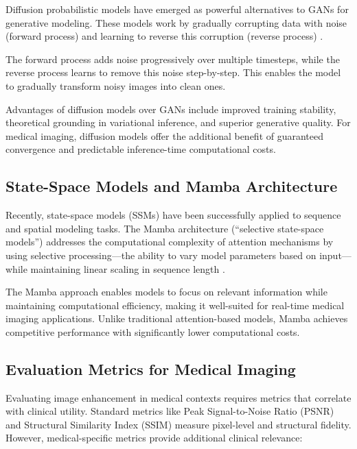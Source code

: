 \documentclass[10pt,conference,letterpaper]{IEEEtran}
\begin{document}
Diffusion probabilistic models have emerged as powerful alternatives to GANs for generative modeling. These models work by gradually corrupting data with noise (forward process) and learning to reverse this corruption (reverse process) \cite{Dehazing_Ultrasound_Using_Diffusion_Models}.

The forward process adds noise progressively over multiple timesteps, while the reverse process learns to remove this noise step-by-step. This enables the model to gradually transform noisy images into clean ones.

Advantages of diffusion models over GANs include improved training stability, theoretical grounding in variational inference, and superior generative quality. For medical imaging, diffusion models offer the additional benefit of guaranteed convergence and predictable inference-time computational costs.

\subsection{State-Space Models and Mamba Architecture}

Recently, state-space models (SSMs) have been successfully applied to sequence and spatial modeling tasks. The Mamba architecture (``selective state-space models'') addresses the computational complexity of attention mechanisms by using selective processing---the ability to vary model parameters based on input---while maintaining linear scaling in sequence length \cite{mamba-ssm}.

The Mamba approach enables models to focus on relevant information while maintaining computational efficiency, making it well-suited for real-time medical imaging applications. Unlike traditional attention-based models, Mamba achieves competitive performance with significantly lower computational costs.

\subsection{Evaluation Metrics for Medical Imaging}

Evaluating image enhancement in medical contexts requires metrics that correlate with clinical utility. Standard metrics like Peak Signal-to-Noise Ratio (PSNR) and Structural Similarity Index (SSIM) measure pixel-level and structural fidelity. However, medical-specific metrics provide additional clinical relevance:
\end{document}

